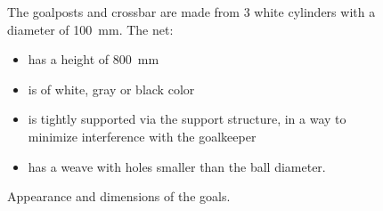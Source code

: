 \begin{figure}[h!]
  \begin{center}
    \leavevmode
    \begin{minipage}[t]{0.49\columnwidth}
    \end{minipage}
    \begin{minipage}[t]{0.49\columnwidth}
      The goalposts and crossbar are made from 3 white cylinders with a diameter of \qty{100}{\milli\metre}.
      The net:
      \begin{itemize}
        \item has a height of \qty{800}{\milli\metre}
        \item is of white, gray or black color
        \item is tightly supported via the support structure, in a way to minimize interference with the goalkeeper
        \item has a weave with holes smaller than the ball diameter.
      \end{itemize}
    \end{minipage}
    \caption{Appearance and dimensions of the goals.}
    \label{fig:goal_appearance}
  \end{center}
\end{figure}

